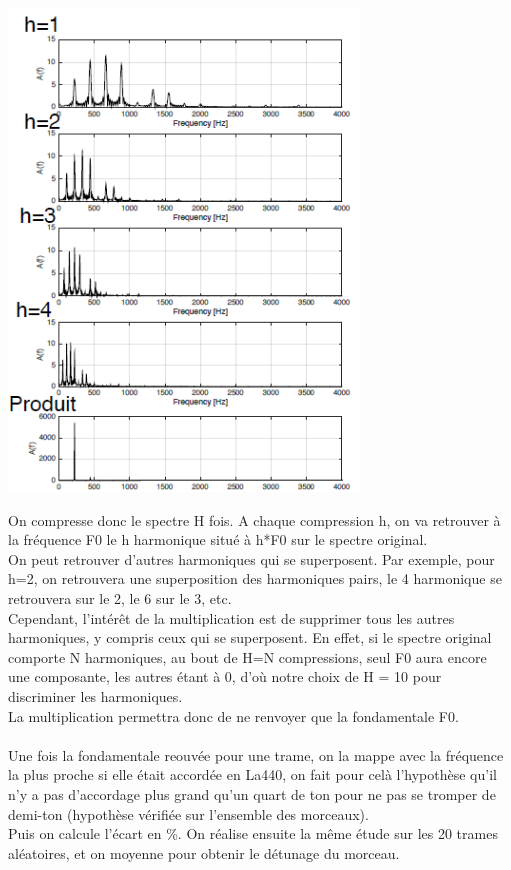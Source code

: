 \documentclass[12pt,a4paper]{article}
\begin{document}
\begin{center}
\includegraphics[width=0.7\textwidth]{produit_spectral.png}
\end{center}

On compresse donc le spectre H fois. A chaque compression h, on va retrouver à la fréquence F0 le h harmonique situé à h*F0 sur le spectre original.
\\On peut retrouver d'autres harmoniques qui se superposent. Par exemple, pour h=2, on retrouvera une superposition des harmoniques pairs, le 4 harmonique se retrouvera sur le 2, le 6 sur le 3, etc. 
\\Cependant, l'intérêt de la multiplication est de supprimer tous les autres harmoniques, y compris ceux qui se superposent. En effet, si le spectre original comporte N harmoniques, au bout de H=N compressions, seul F0 aura encore une composante, les autres étant à 0, d'où notre choix de H = 10 pour discriminer les harmoniques.
\\La multiplication permettra donc de ne renvoyer que la fondamentale F0.
\\
\\Une fois la fondamentale reouvée pour une trame, on la mappe avec la fréquence la plus proche si elle était accordée en La440, on fait pour celà l'hypothèse qu'il n'y a pas d'accordage plus grand qu'un quart de ton pour ne pas se tromper de demi-ton (hypothèse vérifiée sur l'ensemble des morceaux).
\\Puis on calcule l'écart en \%. On réalise ensuite la même étude sur les 20 trames aléatoires, et on moyenne pour obtenir le détunage du morceau.
\end{document}
